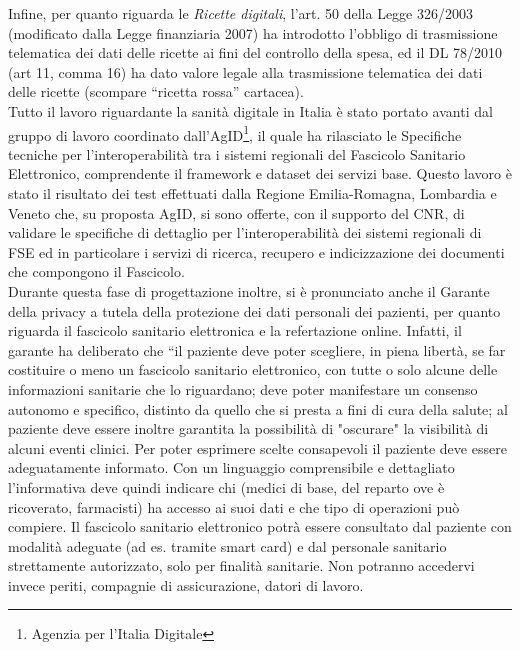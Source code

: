 Infine, per quanto riguarda le \emph{Ricette digitali}, l’art. 50 della Legge 326/2003 (modificato dalla Legge finanziaria 2007) ha introdotto l’obbligo di trasmissione telematica dei dati delle ricette ai fini del controllo della spesa, ed il DL 78/2010 (art 11, comma 16)  ha dato valore legale alla trasmissione telematica dei dati delle ricette (scompare “ricetta rossa” cartacea). \\
Tutto il lavoro riguardante la sanità digitale in Italia è stato portato avanti dal gruppo di lavoro coordinato dall'AgID\footnote{Agenzia per l'Italia Digitale}, il quale ha rilasciato le Specifiche tecniche per l’interoperabilità tra i sistemi regionali del Fascicolo Sanitario Elettronico, comprendente il framework e dataset dei servizi base. Questo lavoro è stato il risultato dei test effettuati dalla Regione Emilia-Romagna, Lombardia e Veneto che, su proposta AgID, si sono offerte, con il supporto del CNR, di validare le specifiche di dettaglio per l’interoperabilità dei sistemi regionali di FSE ed in particolare i servizi di ricerca, recupero e indicizzazione dei documenti che compongono il Fascicolo. \\
Durante questa fase di progettazione inoltre, si è pronunciato anche il Garante della privacy \cite{garante} a tutela della protezione dei dati personali dei pazienti, per quanto riguarda il fascicolo sanitario elettronica e la refertazione online. Infatti, il garante ha deliberato che “il paziente deve poter scegliere, in piena libertà, se far costituire o meno un fascicolo sanitario elettronico, con tutte o solo alcune delle informazioni sanitarie che lo riguardano; deve poter manifestare un consenso autonomo e specifico, distinto da quello che si presta a fini di cura della salute; al paziente deve essere inoltre garantita la possibilità di "oscurare" la visibilità di alcuni eventi clinici. Per poter esprimere scelte consapevoli il paziente deve essere adeguatamente informato. Con un linguaggio comprensibile e dettagliato l'informativa deve quindi indicare chi (medici di base, del reparto ove è ricoverato, farmacisti) ha accesso ai suoi dati e che tipo di operazioni può compiere.
Il fascicolo sanitario elettronico potrà essere consultato dal paziente con modalità adeguate (ad es. tramite smart card) e dal personale sanitario strettamente autorizzato, solo per finalità sanitarie. Non potranno accedervi invece periti, compagnie di assicurazione, datori di lavoro.\\
%
